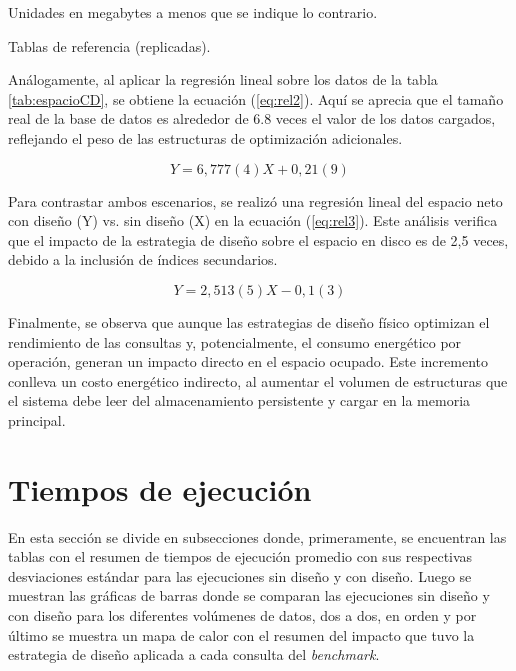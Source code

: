 \documentclass[12pt, letter paper]{report}
\begin{document}
\begin{table}[H]
\begin{threeparttable}
        \begin{tablenotes}
          \item[1] Unidades en megabytes a menos que se indique lo contrario.
          \item[2] Tablas de referencia (replicadas).
        \end{tablenotes}
        \label{tab:espacioCD}
        \end{threeparttable}
      \end{table}

      Análogamente, al aplicar la regresión lineal sobre los datos de la tabla
      \ref{tab:espacioCD}, se obtiene la ecuación (\ref{eq:rel2}). Aquí se
      aprecia que el tamaño real de la base de datos es alrededor de 6.8 veces
      el valor de los datos cargados, reflejando el peso de las estructuras de
      optimización adicionales.

      \begin{equation}
        Y = 6,777(4) X + 0,21(9)
        \label{eq:rel2}
      \end{equation}

      Para contrastar ambos escenarios, se realizó una regresión lineal del
      espacio neto con diseño (Y) vs. sin diseño (X) en la ecuación
      (\ref{eq:rel3}). Este análisis verifica que el impacto de la estrategia de
      diseño sobre el espacio en disco es de 2,5 veces, debido a la inclusión de
      índices secundarios.

      \begin{equation}
        Y = 2,513(5) X - 0,1(3)
        \label{eq:rel3}
      \end{equation}

      Finalmente, se observa que aunque las estrategias de diseño físico
      optimizan el rendimiento de las consultas y, potencialmente, el consumo
      energético por operación, generan un impacto directo en el espacio
      ocupado. Este incremento conlleva un costo energético indirecto, al
      aumentar el volumen de estructuras que el sistema debe leer del
      almacenamiento persistente y cargar en la memoria principal.

    \section{Tiempos de ejecución} %
    \label{sec:tiempos_de_ejecución}
      En esta sección se divide en subsecciones donde, primeramente, se
      encuentran las tablas con el resumen de tiempos de ejecución promedio con
      sus respectivas desviaciones estándar para las ejecuciones sin diseño y
      con diseño. Luego se muestran las gráficas de barras donde se comparan las
      ejecuciones sin diseño y con diseño para los diferentes volúmenes de
      datos, dos a dos, en orden y por último se muestra un mapa de calor con el
      resumen del impacto que tuvo la estrategia de diseño aplicada a cada
      consulta del \textit{benchmark}.
\end{document}
